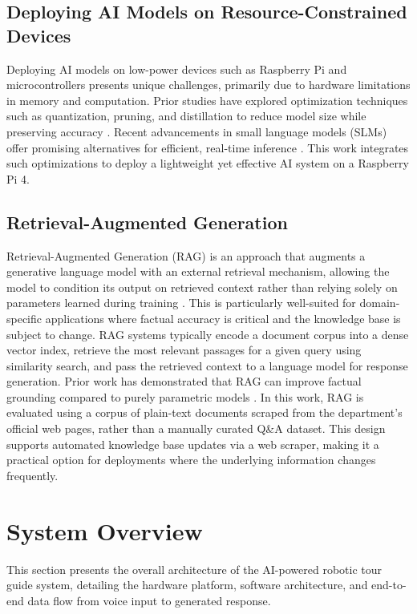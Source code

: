\documentclass[conference]{IEEEtran}
\begin{document}
\subsection{Deploying AI Models on Resource-Constrained Devices}
Deploying AI models on low-power devices such as Raspberry Pi and microcontrollers presents unique challenges, primarily due to hardware limitations in memory and computation. 
Prior studies have explored optimization techniques such as quantization, pruning, and distillation to reduce model size while preserving accuracy \cite{b4}. 
Recent advancements in small language models (SLMs) offer promising alternatives for efficient, real-time inference \cite{b5}. 
This work integrates such optimizations to deploy a lightweight yet effective AI system on a Raspberry Pi 4.

\subsection{Retrieval-Augmented Generation}
Retrieval-Augmented Generation (RAG) is an approach that augments a generative language model with an external retrieval mechanism, allowing the model to condition its output on retrieved context rather than relying solely on parameters learned during training \cite{b17}.
This is particularly well-suited for domain-specific applications where factual accuracy is critical and the knowledge base is subject to change.
RAG systems typically encode a document corpus into a dense vector index, retrieve the most relevant passages for a given query using similarity search, and pass the retrieved context to a language model for response generation.
Prior work has demonstrated that RAG can improve factual grounding compared to purely parametric models \cite{b17}.
In this work, RAG is evaluated using a corpus of plain-text documents scraped from the department's official web pages, rather than a manually curated Q\&A dataset.
This design supports automated knowledge base updates via a web scraper, making it a practical option for deployments where the underlying information changes frequently.

\section{System Overview}
This section presents the overall architecture of the AI-powered robotic tour guide system, detailing the hardware platform,
software architecture, and end-to-end data flow from voice input to generated response.
\end{document}
